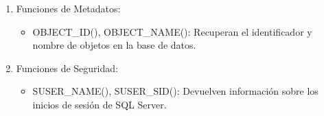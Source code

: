 \documentclass[a4paper,openany,11pt]{article}
\begin{document}
\begin{enumerate}
\begin{enumerate}
        \item Funciones de Metadatos:
        \begin{itemize}
            \item OBJECT\_ID(), OBJECT\_NAME(): Recuperan el identificador y
                nombre de objetos en la base de datos.
        \end{itemize}

        \item Funciones de Seguridad:
        \begin{itemize}
            \item SUSER\_NAME(), SUSER\_SID(): Devuelven información sobre los
                inicios de sesión de SQL Server.
        \end{itemize}
    \end{enumerate}
\end{enumerate}
\end{document}
